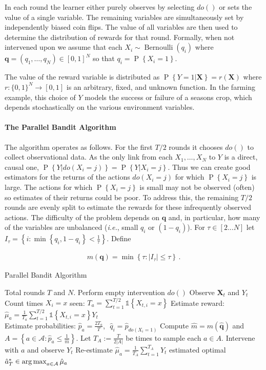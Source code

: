 \documentclass[11pt,a4paper,oneside]{book}
\newcommand{\actions}{\mathcal{A}}
\newcommand{\ie}{\textit{i.e.}}
\newcommand{\set}[1]{\left\{#1\right\}}
\newcommand{\ind}[1]{\mathds{1}\!\!\set{#1}}
\newcommand{\argmax}{\operatornamewithlimits{arg\,max}}
\newcommand{\eq}[1]{\begin{align*}#1\end{align*}}
\renewcommand{\P}[1]{\operatorname{P}\left\{#1\right\}}
\newcommand{\bernoulli}{\operatorname{Bernoulli}}
\renewcommand{\vec}[1]{\boldsymbol{#1}}
\theoremstyle{plain}
\theoremstyle{definition}
\begin{document}
In each round the learner either purely observes by selecting $do()$ or sets the value of a single variable. The remaining variables are simultaneously set by independently biased coin flips. The value of all variables are then used to determine the distribution of rewards for that round. Formally, when not intervened upon we assume that each $X_i \sim \bernoulli(q_i)$ where $\vec{q} = (q_1, \ldots, q_N) \in [0,1]^N$ so that $q_i = \P{X_i = 1}$.

The value of the reward variable is distributed as $\P{Y = 1|\vec{X}} = r(\vec{X})$ where 
$r : \{0,1\}^N \to [0,1]$ is an arbitrary, fixed, and unknown function. 
In the farming example, this choice of $Y$ models the success or failure of a seasons crop, 
which depends stochastically on the various environment variables.


\paragraph{The Parallel Bandit Algorithm}
The algorithm operates as follows. For the first $T/2$ rounds it chooses $do()$ to collect observational data. As the only link from each $X_1,\ldots,X_N$ to $Y$ is a direct, causal one, $\P{Y|do(X_i=j)}=\P{Y|X_i=j}$. Thus we can create good estimators for the returns of the actions $do(X_i = j)$ for which $\P{X_i = j}$ is large. The actions for which $\P{X_i = j}$ is small may not be observed (often) so  estimates of their returns could be poor. To address this, the remaining $T/2$ rounds are evenly split to estimate the rewards for these infrequently observed actions. The difficulty of the problem depends on $\vec{q}$ and, in particular, how many of the variables are unbalanced (\ie, small $q_i$ or $(1-q_i)$). For $\tau \in [2...N]$ let $I_\tau = \set{ i : \min\set{q_i, 1-q_i} < \frac{1}{\tau}}$. Define

\eq{
\label{eq:m-simple}
m(\vec{q}) = \min \set{ \tau : |I_{\tau}| \leq \tau}\,.
}


\begin{algorithm}[H]
\caption{Parallel Bandit Algorithm}\label{alg:simple}
\begin{algorithmic}[1]
 Total rounds $T$ and $N$.
\STATE Perform empty intervention $do()$
\STATE Observe $\vec{X}_t$ and $Y_t$
\ENDFOR
\FOR{$a = do(X_i = x) \in \actions$}
\STATE Count times $X_i = x$ seen: $T_a = \sum_{t=1}^{T/2} \ind{X_{t,i} = x}$
\STATE Estimate reward: $\hat{\mu}_a = \frac{1}{T_a} \sum_{t=1}^{T/2} \ind{X_{t,i} = x} Y_t$ \\[0.2cm]
\STATE Estimate probabilities: $\hat{p}_a = \frac{2 T_a}{T}$,\,\, $\hat q_i = \hat p_{do(X_i = 1)}$
\ENDFOR
\STATE Compute $\hat{m} = m(\vec{\hat q})$ and $A = \set{a \in \actions \colon \hat{p}_a \leq \frac{1}{\hat m}}$.
\STATE Let $T_A := \frac{T}{2 |A|}$ be times to sample each $a\in A$.
\STATE Intervene with $a$ and observe $Y_t$
\ENDFOR
\STATE Re-estimate $\hat{\mu}_a = \frac{1}{T_A} \sum_{t=1}^{T_A} Y_t$
\ENDFOR
\RETURN estimated optimal $\hat{a}^*_T \in \argmax_{a\in\actions} \hat{\mu}_a$
\end{algorithmic}
\end{algorithm}
\end{document}

